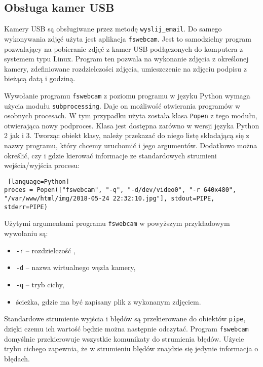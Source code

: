 \documentclass[a4paper,11pt,twoside]{article}
\begin{document}
\subsection{Obsługa kamer USB}
Kamery USB są obsługiwane przez metodę \texttt{wyslij{\_}email}. Do samego wykonywania zdjęć użyta jest aplikacja \texttt{fswebcam}. Jest to samodzielny program pozwalający na pobieranie zdjęć z kamer USB podłączonych do komputera z systemem typu Linux. Program ten pozwala na wykonanie zdjęcia z określonej kamery, zdefiniowane rozdzielczości zdjęcia, umieszczenie na zdjęciu podpisu z bieżącą datą i godziną. 

Wywołanie programu \texttt{fswebcam} z poziomu programu w języku Python wymaga użycia modułu \texttt{subprocessing}. Daje on możliwość otwierania programów w osobnych procesach. W tym przypadku użyta została klasa \texttt{Popen} z tego modułu, otwierająca nowy podproces. Klasa jest dostępna zarówno w wersji języka Python 2 jak i 3. Tworząc obiekt klasy, należy przekazać do niego listę składającą się z nazwy programu, który chcemy uruchomić i jego argumentów. Dodatkowo można określić, czy i gdzie kierować informacje ze standardowych strumieni wejścia/wyjścia procesu:

\begin{lstlisting} [language=Python]
proces = Popen(["fswebcam", "-q", "-d/dev/video0", "-r 640x480", "/var/www/html/img/2018-05-24 22:32:10.jpg"], stdout=PIPE, stderr=PIPE)
\end{lstlisting}

Użytymi argumentami programu \texttt{fswebcam} w powyższym przykładowym wywołaniu są:
\begin{itemize}
\item \texttt{-r} -- rozdzielczość , 
\item \texttt{-d} -- nazwa wirtualnego węzła kamery,
\item \texttt{-q} -- tryb cichy,
\item ścieżka, gdzie ma być zapisany plik z wykonanym zdjęciem.
\end{itemize}
Standardowe strumienie wyjścia i błędów są przekierowane do obiektów \texttt{pipe}, dzięki czemu ich wartość będzie można następnie odczytać. Program \texttt{fswebcam} domyślnie przekierowuje wszystkie komunikaty do strumienia błędów. Użycie trybu cichego zapewnia, że w strumieniu błędów znajdzie się jedynie informacja o błędach.
\end{document}
